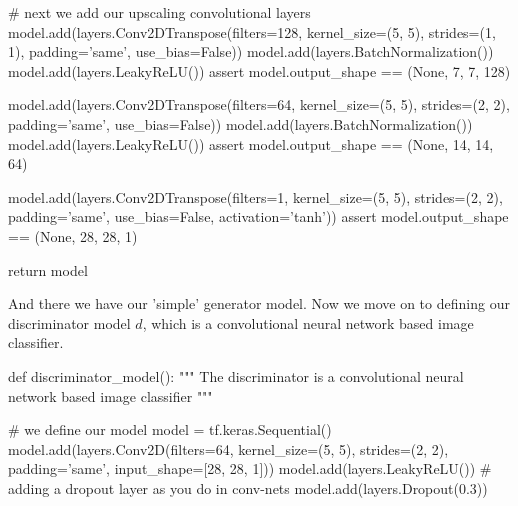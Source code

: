 \documentclass[%
oneside,                 %
final,                   %
10pt]{article}
\begin{document}
    # next we add our upscaling convolutional layers
    model.add(layers.Conv2DTranspose(filters=128,
                                     kernel_size=(5, 5),
                                     strides=(1, 1),
                                     padding='same',
                                     use_bias=False))
    model.add(layers.BatchNormalization())
    model.add(layers.LeakyReLU())
    assert model.output_shape == (None, 7, 7, 128)

    model.add(layers.Conv2DTranspose(filters=64,
                                     kernel_size=(5, 5),
                                     strides=(2, 2),
                                     padding='same',
                                     use_bias=False))
    model.add(layers.BatchNormalization())
    model.add(layers.LeakyReLU())
    assert model.output_shape == (None, 14, 14, 64)

    model.add(layers.Conv2DTranspose(filters=1,
                                     kernel_size=(5, 5),
                                     strides=(2, 2),
                                     padding='same',
                                     use_bias=False,
                                     activation='tanh'))
    assert model.output_shape == (None, 28, 28, 1)

    return model


\epycod


And there we have our 'simple' generator model. Now we move on to defining our
discriminator model $d$, which is a convolutional neural network based image
classifier.































\bpycod
def discriminator_model():
    """
    The discriminator is a convolutional neural network based image classifier
    """

    # we define our model
    model = tf.keras.Sequential()
    model.add(layers.Conv2D(filters=64,
                            kernel_size=(5, 5),
                            strides=(2, 2),
                            padding='same',
                            input_shape=[28, 28, 1]))
    model.add(layers.LeakyReLU())
    # adding a dropout layer as you do in conv-nets
    model.add(layers.Dropout(0.3))
\end{document}
